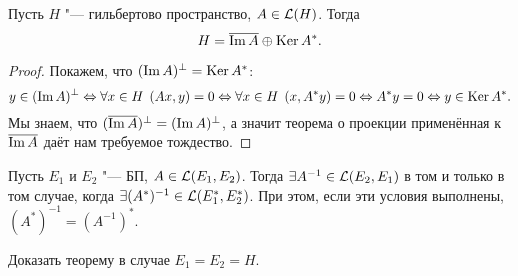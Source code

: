 \documentclass[main]{subfiles}
\begin{document}

\begin{theorem}\label{thm:conjugate-complement}%
  Пусть $H$ "--- гильбертово пространство,
  \( A \in \Linears{H} \). Тогда
  \[
    H = \overline{\operatorname{Im} A} \oplus \operatorname{Ker} A^*.
  \]
\end{theorem}
\begin{proof}
  Покажем, что $(\operatorname{Im} A)^\perp = \operatorname{Ker} A^*$:
  \[
    y \in (\operatorname{Im} A)^\perp
    \Leftrightarrow \forall {x \in H} \; \, (Ax, y) = 0
    \Leftrightarrow \forall {x \in H} \; \, (x, A^* y) = 0
    \Leftrightarrow A^* y = 0
    \Leftrightarrow y \in \operatorname{Ker} A^*.
  \]
  Мы знаем, что
  \( (\overline{\operatorname{Im} A})^\perp = (\operatorname{Im} A)^\perp \),
  а значит теорема о проекции
  применённая к \( \overline{\operatorname{Im} A} \)
  даёт нам требуемое тождество.
\end{proof}


\begin{theorem}[б/д]%
  Пусть \( E_1 \) и \( E_2 \) "--- БП,
  \( A \in \Linears{E_1, E_2} \).
  Тогда
  \( \exists A^{-1} \in \Linears{E_2, E_1} \)
  в том и только в том случае,
  когда \( \exists (A^*)^{-1} \in \Linears{E_1^*, E_2^*} \).
  При этом, если эти условия выполнены,
  \( (A^*)^{-1} = (A^{-1})^* \).
\end{theorem}

\begin{exercise}
  Доказать теорему в случае \( E_1 = E_2 = H \).
\end{exercise}
\end{document}

